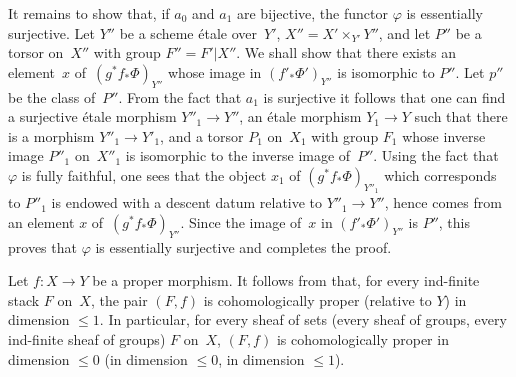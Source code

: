 It remains to show that, if $a_0$ and $a_1$ are bijective, the
functor $\varphi$ is essentially surjective. Let $Y''$ be a
scheme \'etale over~$Y'$, $X'' = X' \times_{Y'} Y''$, and
let $P''$ be a torsor on~$X''$ with group $F'' = F'|X''$. We shall
show that there exists an element~$x$ of~$(g^* f_*
\Phi)_{Y''}$ whose image in $(f'_* \Phi')_{Y''}$ is isomorphic
to $P''$. Let $p''$ be the class of~$P''$. From the fact that $a_1$ is
surjective it follows that one can find a surjective \'etale
morphism $Y''_1 \to Y''$, an \'etale morphism $Y_1 \to Y$ such that
there is a morphism $Y''_1 \to Y'_1$, and a torsor $P_1$ on~$X_1$
with group $F_1$ whose inverse image $P''_1$ on~$X''_1$ is
isomorphic to the inverse image of~$P''$. Using the fact that
$\varphi$ is fully faithful, one sees that the object $x_1$ of
$(g^* f_* \Phi)_{Y''_1}$ which corresponds to $P''_1$ is endowed
with a descent datum relative to $Y''_1 \to Y''$, hence
comes from an element $x$ of~$(g^* f_*
\Phi)_{Y''}$. Since the image of~$x$ in $(f'_* \Phi')_{Y''}$ is
$P''$, this proves that $\varphi$ is essentially surjective and
completes the proof.

\begin{example}
\label{XIII.1.4}
Let $f \colon X \to Y$ be a proper morphism. It follows from \cite[VII
2.2.2]{XIII.2} that, for every ind-finite stack $F$ on~$X$, the pair $(F,f)$
is cohomologically proper (relative to $Y$) in dimension
$\leqslant 1$. In particular, for every sheaf of sets
(\resp every sheaf of groups, \resp every ind-finite sheaf of
groups) $F$ on~$X$, $(F,f)$ is cohomologically
proper in dimension $\leqslant 0$ (\resp in dimension $\leqslant 0$,
\resp in dimension $\leqslant 1$).
\end{example}

